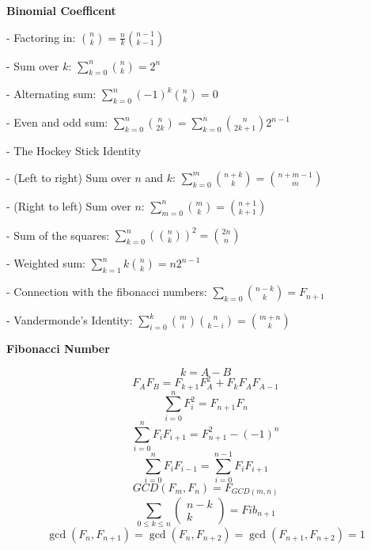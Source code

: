 \textbf{Binomial Coefficent}

- Factoring in: \( \binom{n}{k} = \frac{n}{k} \binom{n - 1}{k - 1} \)

- Sum over \( k \): \( \sum_{k = 0}^n \binom{n}{k} = 2^n \)

- Alternating sum: \( \sum_{k = 0}^n (-1)^k \binom{n}{k} = 0 \)

- Even and odd sum: \( \sum_{k = 0}^n \binom{n}{2k} = \sum_{k = 0}^n \binom{n}{2k + 1} 2^{n - 1} \)

- The Hockey Stick Identity

   - (Left to right) Sum over \( n \) and \( k \): \( \sum_{k = 0}^m \binom{n + k}{k} = \binom{n + m - 1}{m} \)

   - (Right to left) Sum over \( n \): \( \sum_{m = 0}^n \binom{m}{k} = \binom{n + 1}{k + 1} \)

- Sum of the squares: \( \sum_{k = 0}^n (\binom{n}{k})^2 = \binom{2n}{n} \)

- Weighted sum: \( \sum_{k = 1}^n k \binom{n}{k} = n2^{n - 1} \)

- Connection with the fibonacci numbers: \( \sum_{k = 0}\binom{n - k}{k} = F_{n + 1} \)

- Vandermonde's Identity: \( \sum_{i = 0}^k \binom{m}{i} \binom{n}{k - i} = \binom{m + n}{k} \)

\textbf{Fibonacci Number}

$$
k=A-B
$$
\begin{equation}
F_A F_B=F_{k+1} F_A^2+F_k F_A F_{A-1}
\end{equation}
\begin{equation}
\sum_{i=0}^n F_i^2=F_{n+1} F_n
\end{equation}
\begin{equation}
\sum_{i=0}^n F_i F_{i+1}=F_{n+1}^2-(-1)^n 
\end{equation}
\begin{equation}
    \sum_{i=0}^n F_i F_{i-1}=\sum_{i=0}^{n-1} F_i F_{i+1}
\end{equation}
\begin{equation}
G C D\left(F_m, F_n\right)=F_{G C D(m, n)}
\end{equation}
\begin{equation}
\sum_{0 \leq k \leq n}\left(\begin{array}{c}
n-k \\
k
\end{array}\right)=F i b_{n+1}
\end{equation}
\begin{equation}
\operatorname{gcd}\left(F_n, F_{n+1}\right)=\operatorname{gcd}\left(F_n, F_{n+2}\right)= \operatorname{gcd}\left(F_{n+1}, F_{n+2}\right)=1
\end{equation}

